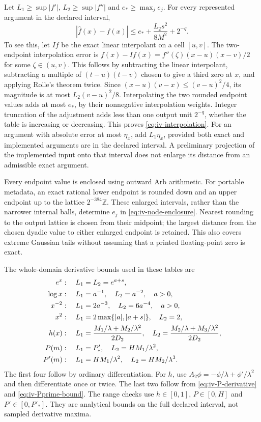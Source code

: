 Let $L_1\geq\sup|f'|$, $L_2\geq\sup|f''|$ and $e_*\geq\max_je_j$.
For every represented argument in the declared interval,
\begin{equation}
 |\widehat f(x)-f(x)|\leq e_*+\frac{L_2s^2}{8M^2}+2^{-q}.
 \label{eq:iv-interpolation}
\end{equation}
To see this, let $I f$ be the exact linear interpolant on a cell
$[u,v]$.  The two-endpoint interpolation error is
$f(x)-I f(x)=f''(\zeta)(x-u)(x-v)/2$ for some $\zeta\in(u,v)$.
This follows by subtracting the linear interpolant, subtracting a multiple
of $(t-u)(t-v)$ chosen to give a third zero at $x$, and applying Rolle's
theorem twice.  Since $(x-u)(v-x)\leq(v-u)^2/4$, its magnitude is at most
$L_2(v-u)^2/8$.  Interpolating the two rounded endpoint values adds at most
$e_*$, by their nonnegative interpolation weights.  Integer truncation of
the adjustment adds less than one output unit $2^{-q}$, whether the table
is increasing or decreasing.  This proves \eqref{eq:iv-interpolation}.
For an argument with absolute error at most $\eta_x$, add $L_1\eta_x$,
provided both exact and implemented arguments are in the declared interval.
A preliminary projection of the implemented input onto that interval does
not enlarge its distance from an admissible exact argument.

Every endpoint value is enclosed using outward Arb arithmetic.  For portable
metadata, an exact rational lower endpoint is rounded down and an upper
endpoint up to the lattice $2^{-384}\mathbb Z$.  These enlarged intervals,
rather than the narrower internal balls, determine $e_j$ in
\eqref{eq:iv-node-enclosure}.  Nearest rounding to the output lattice is
chosen from their midpoint; the largest distance from the chosen dyadic value
to either enlarged endpoint is retained.  This also covers extreme Gaussian
tails without assuming that a printed floating-point zero is exact.

The whole-domain derivative bounds used in these tables are
\begin{align}
 e^x &: \quad L_1=L_2=e^{a+s},\notag\\
 \log x &: \quad L_1=a^{-1},\quad L_2=a^{-2},\quad a>0,\notag\\
 x^{-2} &: \quad L_1=2a^{-3},\quad L_2=6a^{-4},\quad a>0,\notag\\
 x^2 &: \quad L_1=2\max\{|a|,|a+s|\},\quad L_2=2,\notag\\
 h(x) &: \quad
 L_1=\frac{M_1/\lambda+M_2/\lambda^2}{2D_2},\quad
 L_2=\frac{M_2/\lambda+M_3/\lambda^2}{2D_2},\notag\\
 P(m) &: \quad L_1=P'_*,\quad L_2=HM_1/\lambda^2,\notag\\
 P'(m) &: \quad L_1=HM_1/\lambda^2,\quad L_2=HM_2/\lambda^3.
 \label{eq:iv-scalar-derivatives}
\end{align}
The first four follow by ordinary differentiation.  For $h$, use
$A_2\phi=-\phi/\lambda+\phi'/\lambda^2$ and then differentiate once or
twice.  The last two follow from \eqref{eq:iv-P-derivative} and
\eqref{eq:iv-Pprime-bound}.  The range checks use $h\in[0,1]$, $P\in[0,H]$
and $P'\in[0,P'_*]$.  They are analytical bounds on the full declared
interval, not sampled derivative maxima.

